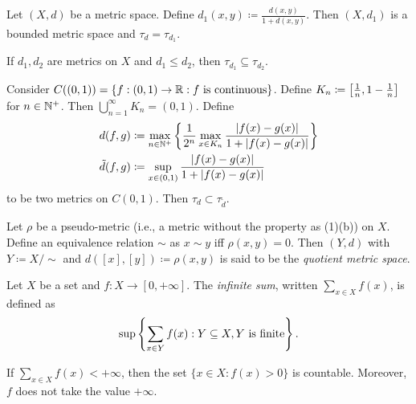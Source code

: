 \documentclass{techreport}
\begin{document}
\begin{proposition}\label{Prop:MetricCanAlwaysBounded}
	Let $(X,d)$ be a metric space.
	Define $d_1(x,y) \coloneqq \frac{d(x,y)}{1 + d(x,y)}$.
	Then $(X,d_1)$ is a bounded metric space and $\tau_d = \tau_{d_1}$.
\end{proposition}

\begin{lemma}\label{Lem:SmallerMetricIsWeaker}
	If $d_1,d_2$ are metrics on $X$ and $d_1 \le d_2$, then $\tau_{d_1} \subseteq \tau_{d_2}$.
\end{lemma}

\begin{remark}\label{Rem:SmallerMetricIndeedWeaker}
	Consider $C((0,1)) = \{ f : (0,1) \to \mathbb{R} : f~\text{is continuous} \}$.
	Define $K_n \coloneqq \left[{\frac{1}{n}, 1-\frac{1}{n}}\right]$ for $n \in \mathbb{N}^+$.
	Then $\bigcup_{n=1}^\infty K_n = (0,1)$.
	Define
	\begin{align*}
		d(f,g) & \coloneqq \max_{n \in \mathbb{N}^+} \left\{ { \frac{1}{2^n} \max_{x \in K_n} \frac{\left|{f(x)-g(x)}\right|}{1+\left|{f(x)-g(x)}\right|} } \right\} \\
		\tilde{d}(f,g) & \coloneqq  \sup_{x \in (0,1)} \frac{\left|{f(x)-g(x)}\right|}{1+\left|{f(x)-g(x)}\right|}
	\end{align*}
	to be two metrics on $C(0,1)$.
	Then $\tau_d \subset \tau_{\tilde{d}}$.
\end{remark}

\begin{definition}\label{De:QuotientMetricSpaces}
	Let $\rho$ be a pseudo-metric (i.e., a metric without the property as (1)(b)) on $X$.
	Define an equivalence relation ${\sim}$ as $x \sim y$ iff $\rho(x,y) = 0$.
	Then $(Y,d)$ with $Y \coloneqq X / {\sim}$ and $d([x],[y]) \coloneqq \rho(x,y)$ is said to be the \emph{quotient metric space}.
\end{definition}

\begin{definition}\label{De:InifiniteSums}
	Let $X$ be a set and $f : X \to [0,+\infty]$.
	The \emph{infinite sum}, written $\sum_{x \in X} f(x)$, is defined as
	\begin{equation*}
		\sup \left\{ { \sum_{x \in Y} f(x) : Y \subseteq X, Y~\text{is finite} } \right\}.
	\end{equation*}
\end{definition}

\begin{proposition}\label{Prop:FiniteSumImplyCountableNonZero}
	If $\sum_{x \in X} f(x) < +\infty$, then the set $\{ x \in X : f(x) > 0\}$ is countable.
	Moreover, $f$ does not take the value $+\infty$.
\end{proposition}
\end{document}
